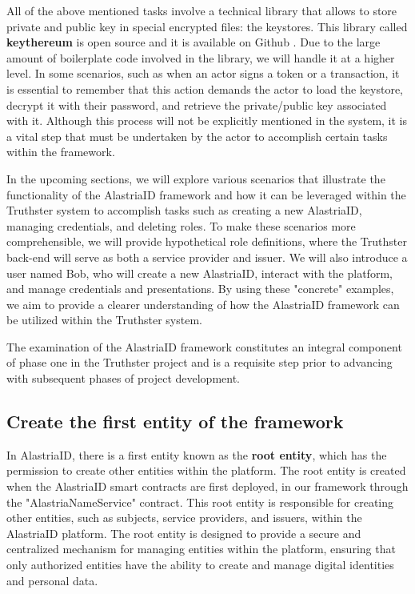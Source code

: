 \documentclass[target=mst,aauheader=]{thud}
\begin{document}
All of the above mentioned tasks involve a technical library that allows to store private and public key in special encrypted files: the keystores. This library called \textbf{keythereum} is open source and it is available on Github \cite{keythereum}. Due to the large amount of boilerplate code involved in the library, we will handle it at a higher level. In some scenarios, such as when an actor signs a token or a transaction, it is essential to remember that this action demands the actor to load the keystore, decrypt it with their password, and retrieve the private/public key associated with it. Although this process will not be explicitly mentioned in the system, it is a vital step that must be undertaken by the actor to accomplish certain tasks within the framework.\par
In the upcoming sections, we will explore various scenarios that illustrate the functionality of the AlastriaID framework and how it can be leveraged within the Truthster system to accomplish tasks such as creating a new AlastriaID, managing credentials, and deleting roles. To make these scenarios more comprehensible, we will provide hypothetical role definitions, where the Truthster back-end will serve as both a service provider and issuer. We will also introduce a user named Bob, who will create a new AlastriaID, interact with the platform, and manage credentials and presentations. By using these "concrete" examples, we aim to provide a clearer understanding of how the AlastriaID framework can be utilized within the Truthster system.\par
The examination of the AlastriaID framework constitutes an integral component of phase one in the Truthster project and is a requisite step prior to advancing with subsequent phases of project development.

\subsection{Create the first entity of the framework}

In AlastriaID, there is a first entity known as the \textbf{root entity}, which has the permission to create other entities within the platform. The root entity is created when the AlastriaID smart contracts are first deployed, in our framework through the "AlastriaNameService" contract. This root entity is responsible for creating other entities, such as subjects, service providers, and issuers, within the AlastriaID platform. The root entity is designed to provide a secure and centralized mechanism for managing entities within the platform, ensuring that only authorized entities have the ability to create and manage digital identities and personal data.
\end{document}
